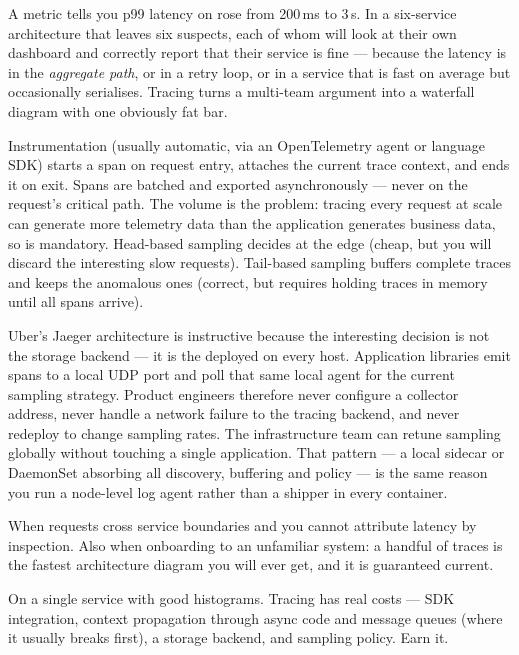  A metric tells you p99 latency on  rose from 200\,ms to 3\,s. In a six-service architecture that leaves six suspects, each of whom will look at their own dashboard and correctly report that their service is fine --- because the latency is in the \emph{aggregate path}, or in a retry loop, or in a service that is fast on average but occasionally serialises. Tracing turns a multi-team argument into a waterfall diagram with one obviously fat bar.

 Instrumentation (usually automatic, via an OpenTelemetry agent or language SDK) starts a span on request entry, attaches the current trace context, and ends it on exit. Spans are batched and exported asynchronously --- never on the request's critical path. The volume is the problem: tracing every request at scale can generate more telemetry data than the application generates business data, so  is mandatory. Head-based sampling decides at the edge (cheap, but you will discard the interesting slow requests). Tail-based sampling buffers complete traces and keeps the anomalous ones (correct, but requires holding traces in memory until all spans arrive).

\begin{infranote}
Uber's Jaeger architecture is instructive because the interesting decision is not the storage backend --- it is the  deployed on every host. Application libraries emit spans to a local UDP port and poll that same local agent for the current sampling strategy. Product engineers therefore never configure a collector address, never handle a network failure to the tracing backend, and never redeploy to change sampling rates. The infrastructure team can retune sampling globally without touching a single application. That pattern --- a local sidecar or DaemonSet absorbing all discovery, buffering and policy --- is the same reason you run a node-level log agent rather than a shipper in every container.
\end{infranote}

 When requests cross service boundaries and you cannot attribute latency by inspection. Also when onboarding to an unfamiliar system: a handful of traces is the fastest architecture diagram you will ever get, and it is guaranteed current.

 On a single service with good histograms. Tracing has real costs --- SDK integration, context propagation through async code and message queues (where it usually breaks first), a storage backend, and sampling policy. Earn it.

